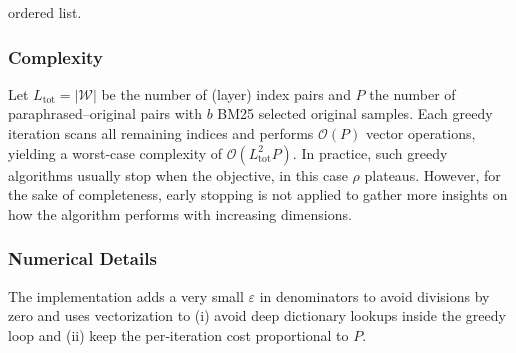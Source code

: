 \begin{algorithm}[htb]
\Return ordered list.
\end{algorithm}

\subsubsection{Complexity}
Let $L_\text{tot}=|\mathcal{W}|$ be the number of (layer) index pairs and $P$ the number of paraphrased–original pairs with $b$ BM25 selected original samples. Each greedy iteration scans all remaining indices and performs $\mathcal{O}(P)$ vector operations, yielding a worst‑case complexity of $\mathcal{O}(L_\text{tot}^2 P)$. In practice, such greedy algorithms usually stop when the objective, in this case $\rho$ plateaus. However, for the sake of completeness, early stopping is not applied to gather more insights on how the algorithm performs with increasing dimensions.

\subsubsection{Numerical Details}
The implementation adds a very small $\varepsilon$ in denominators to avoid divisions by zero and uses vectorization to (i) avoid deep dictionary lookups inside the greedy loop and (ii) keep the per‑iteration cost proportional to $P$.

